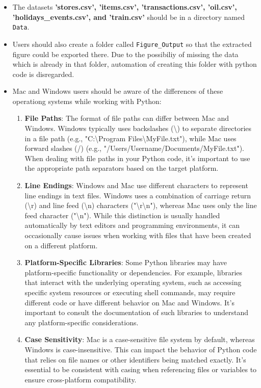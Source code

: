 \begin{itemize}
	\item The datasets \textbf{'stores.csv', 'items.csv', 'transactions.csv', 'oil.csv', 'holidays\_events.csv', and 'train.csv'} should be in a directory named \texttt{Data}. 
	\item Users should also create a folder called \texttt{Figure\_Output} so that the extracted figure could be exported there. Due to the possibiliy of missing the data which is already in that folder, automation of creating this folder with python code is disregarded.
	\item Mac and Windows users should be aware of the differences of these operationg systems while working with Python:
	\begin{enumerate}
		\item \textbf{File Paths}: The format of file paths can differ between Mac and Windows. Windows typically uses backslashes (\textbackslash) to separate directories in a file path (e.g., "C:\textbackslash Program Files\textbackslash MyFile.txt"), while Mac uses forward slashes (/) (e.g., "/Users/Username/Documents/MyFile.txt"). When dealing with file paths in your Python code, it's important to use the appropriate path separators based on the target platform.
		
		\item \textbf{Line Endings}: Windows and Mac use different characters to represent line endings in text files. Windows uses a combination of carriage return (\textbackslash r) and line feed (\textbackslash n) characters ("\textbackslash r\textbackslash n"), whereas Mac uses only the line feed character ("\textbackslash n"). While this distinction is usually handled automatically by text editors and programming environments, it can occasionally cause issues when working with files that have been created on a different platform.
		
		\item \textbf{Platform-Specific Libraries}: Some Python libraries may have platform-specific functionality or dependencies. For example, libraries that interact with the underlying operating system, such as accessing specific system resources or executing shell commands, may require different code or have different behavior on Mac and Windows. It's important to consult the documentation of such libraries to understand any platform-specific considerations.
		
		\item \textbf{Case Sensitivity}: Mac is a case-sensitive file system by default, whereas Windows is case-insensitive. This can impact the behavior of Python code that relies on file names or other identifiers being matched exactly. It's essential to be consistent with casing when referencing files or variables to ensure cross-platform compatibility.
	\end{enumerate}
\end{itemize}


